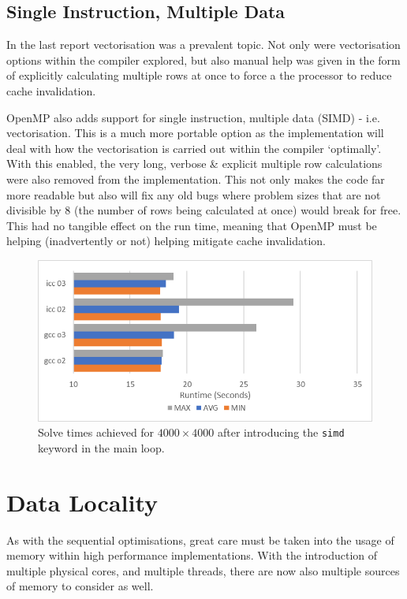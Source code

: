 \documentclass[11pt,twocolumn,a4paper]{article}
\begin{document}
\subsection{Single Instruction, Multiple Data}
In the last report vectorisation was a prevalent topic. Not only were vectorisation options within the compiler explored, but also manual help was given in the form of explicitly calculating multiple rows at once to force a the processor to reduce cache invalidation. \par

OpenMP also adds support for single instruction, multiple data (SIMD) - i.e. vectorisation. This is a much more portable option as the implementation will deal with how the vectorisation is carried out within the compiler `optimally'. With this enabled, the very long, verbose \& explicit multiple row calculations were also removed from the implementation. This not only makes the code far more readable but also will fix any old bugs where problem sizes that are not divisible by 8 (the number of rows being calculated at once) would break for free. This had no tangible effect on the run time, meaning that OpenMP must be helping (inadvertently or not) helping mitigate cache invalidation. \par

\begin{figure}[h]
        \centering
        \includegraphics[width=0.8\linewidth]{figures/4-SIMD-W-REDUX.png}
        \caption{Solve times achieved for $4000\times4000$ after introducing the \texttt{simd} keyword in the main loop.}
        \label{fig-4-simd}
\end{figure}


\section{Data Locality}
As with the sequential optimisations, great care must be taken into the usage of memory within high performance implementations. With the introduction of multiple physical cores, and multiple threads, there are now also multiple sources of memory to consider as well. \par
\end{document}
